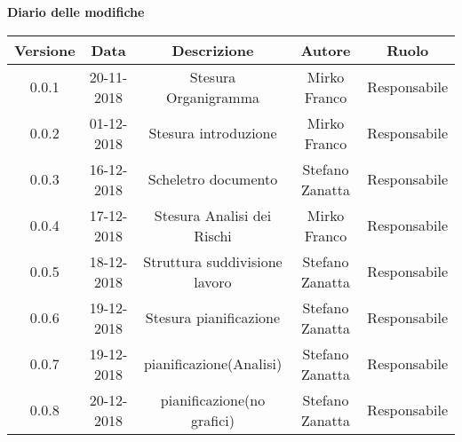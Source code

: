	\begin{center}
		\textbf{Diario delle modifiche}
	\end{center}
	\begin{center}
		\begin{tabular}{|c|c|c|c|c|}
			\hline
			\textbf{Versione} & \textbf{Data} & \textbf{Descrizione} & \textbf{Autore} & \textbf{Ruolo} \\
			\hline
			0.0.1 & 20-11-2018 & Stesura Organigramma & Mirko Franco & Responsabile\\
			\hline
			0.0.2 & 01-12-2018 & Stesura introduzione & Mirko Franco & Responsabile\\
			\hline
			0.0.3 & 16-12-2018 & Scheletro documento &Stefano Zanatta & Responsabile\\
			\hline
			0.0.4 & 17-12-2018 & Stesura Analisi dei Rischi & Mirko Franco & Responsabile\\
			\hline
			0.0.5 & 18-12-2018 & Struttura suddivisione lavoro & Stefano Zanatta & Responsabile\\
			\hline
			0.0.6 & 19-12-2018 & Stesura pianificazione & Stefano Zanatta & Responsabile\\
			\hline
			0.0.7 & 19-12-2018 & pianificazione(Analisi) & Stefano Zanatta & Responsabile\\
			\hline
			0.0.8 & 20-12-2018 & pianificazione(no grafici) & Stefano Zanatta & Responsabile\\
			\hline
			
		\end{tabular}
	\end{center}
\newpage